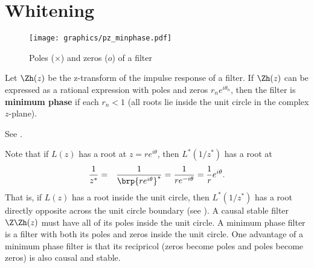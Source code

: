\section{Whitening}
\label{sec:d-whiten}
\begin{figure}[h]
  \centering
  \texttt{[image: graphics/pz\_minphase.pdf]}
  \caption{
     Poles ($\times$) and zeros ($o$) of a  filter
     \label{fig:w_pz_minphase}
     }
\end{figure}
\begin{definition}
Let $\Zh(z)$ be the z-transform of the impulse response of a filter.
If $\Zh(z)$ can be expressed as a rational expression with poles and zeros
$r_ne^{i\theta_n}$,
then the filter is \textbf{minimum phase} if each $r_n<1$
(all roots lie inside the unit circle in the complex $z$-plane).
\end{definition}
See .

Note that if $L(z)$ has a root at $z=re^{i\theta}$, then
$L^\ast(1/z^\ast)$ has a root at
\begin{eqnarray*}
   \frac{1}{z^\ast}
     &=& \frac{1}{\brp{re^{i\theta}}^\ast}
      = \frac{1}{re^{-i\theta}}
      = \frac{1}{r} e^{i\theta}.
\end{eqnarray*}
That is, if $L(z)$ has a root inside the unit circle,
then $L^\ast(1/z^\ast)$ has a root directly opposite across the unit circle
boundary (see ).
A causal stable filter $\Z\Zh(z)$ must have all of its poles inside
the unit circle.
A minimum phase filter is a filter with both its poles and zeros inside the
unit circle.
One advantage of a minimum phase filter is that its recipricol
(zeros become poles and poles become zeros)
is also causal and stable.

